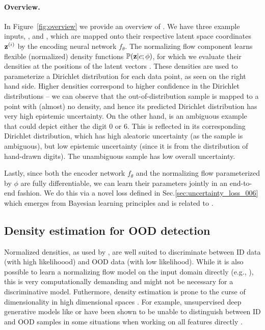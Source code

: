 \paragraph{Overview.} In Figure~\ref{fig:overview} we provide an overview of \PostNet. We have three example inputs,  , and , which are mapped onto their respective latent space coordinates $\latent\dataix$ by the encoding neural network $f_\theta$. The normalizing flow component learns flexible (normalized) density functions $\mathbb{P}(\bold{z}|c;\phi)$, for which we evaluate their densities at the positions of the latent vectors \smash{$\latent\dataix$}. These densities are used to parameterize a Dirichlet distribution for each data point, as seen on the right hand side. Higher densities correspond to higher confidence in the Dirichlet distributions -- we can observe that the out-of-distribution sample  is mapped to a point with (almost) no density, and hence its predicted Dirichlet distribution has very high epistemic uncertainty. On the other hand,  is an ambiguous example that could depict either the digit 0 or 6. This is reflected in its corresponding Dirichlet distribution, which has high aleatoric uncertainty (as the sample is ambiguous), but low epistemic uncertainty (since it is from the distribution of hand-drawn digits). The unambiguous sample  has low overall uncertainty.

Lastly, since both the encoder network $f_\theta$ and the normalizing flow parameterized by $\phi$ are fully differentiable, we can learn their parameters jointly in an end-to-end fashion. We do this via a novel loss  defined in Sec.\ref{sec:uncertainty_loss_006} which emerges from Bayesian learning principles \cite{PAC_bayesian_estimator} and is related to \UCEacro \cite{uceloss}.

\subsection{Density estimation for OOD detection}

Normalized densities, as used by \PostNetacro, are well suited to discriminate between ID data (with high likelihoood) and OOD data (with low likelihood). While it is also possible to learn a normalizing flow model on the input domain directly (e.g., \cite{NIPS2017_6828, NIPS2018_8224, grathwohl2018scalable}), this is very computationally demanding and might not be necessary for a discriminative model. Futhermore, density estimation is prone to the curse of dimensionality in high dimensional spaces \cite{typicality_OOD_generative, waic_robust_anomaly_detection}. For example, unsupervised deep generative models like \cite{glow} or \cite{pixel_cnn} have been shown to be unable to distinguish between ID and OOD samples in some situations when working on all features directly \cite{deep_generative_do_not_know, energy_based_classifier}. 

